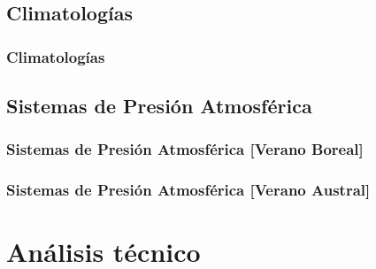 \documentclass{beamer}
\newtheorem{Th2}{Definición}
\begin{document}
	\subsection{Climatologías}
	\begin{frame}
		\frametitle{Climatologías}
		\begin{figure}[!hbt]
		   \centering
		\end{figure}
	\end{frame} 

	\subsection{Sistemas de Presión Atmosférica}
	\begin{frame}
		\frametitle{Sistemas de Presión Atmosférica [Verano Boreal]}
		\begin{figure}[!hbt]
		   \centering
		\end{figure}
	\end{frame} 

	\begin{frame}
		\frametitle{Sistemas de Presión Atmosférica [Verano Austral]}
		\begin{figure}[!hbt]
		   \centering
		\end{figure}
	\end{frame} 

	\section{Análisis técnico}
\end{document}
